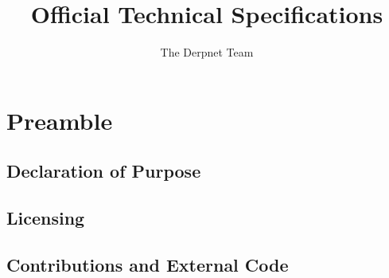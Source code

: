 \documentclass[11pt]{article}
\title{Official Technical Specifications}
\author{The Derpnet Team}
\begin{document}
\maketitle

\section{Preamble}

\subsection{Declaration of Purpose}

\subsection{Licensing}

\subsection{Contributions and External Code}

\section{}
\end{document}
